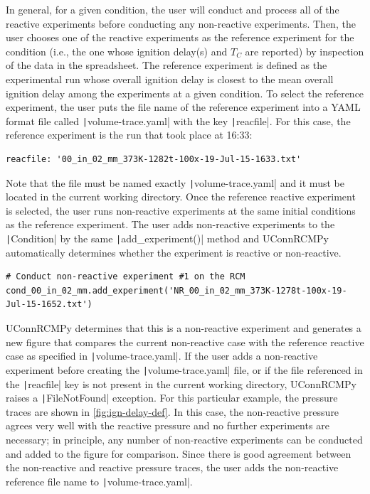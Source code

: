 \documentclass[12pt]{../ussci}
\begin{document}
In general, for a given condition, the user will conduct and process all
of the reactive experiments before conducting any non-reactive
experiments. Then, the user chooses one of the reactive experiments as
the reference experiment for the condition (i.e., the one whose ignition
delay(s) and \(T_C\) are reported) by inspection of the data in the
spreadsheet. The reference experiment is defined as the experimental run
whose overall ignition delay is closest to the mean overall ignition
delay among the experiments at a given condition. To select the
reference experiment, the user puts the file name of the reference
experiment into a YAML format file called \texttt|volume-trace.yaml|
with the key \texttt|reacfile|. For this case, the reference experiment
is the run that took place at 16:33:

\begin{verbatim}
reacfile: '00_in_02_mm_373K-1282t-100x-19-Jul-15-1633.txt'
\end{verbatim}

Note that the file must be named exactly \texttt|volume-trace.yaml| and
it must be located in the current working directory. Once the reference
reactive experiment is selected, the user runs non-reactive experiments
at the same initial conditions as the reference experiment. The user
adds non-reactive experiments to the \texttt|Condition| by the same
\texttt|add_experiment()| method and UConnRCMPy automatically
determines whether the experiment is reactive or non-reactive.

\begin{verbatim}
# Conduct non-reactive experiment #1 on the RCM
cond_00_in_02_mm.add_experiment('NR_00_in_02_mm_373K-1278t-100x-19-Jul-15-1652.txt')
\end{verbatim}

UConnRCMPy determines that this is a non-reactive experiment and
generates a new figure that compares the current non-reactive case with
the reference reactive case as specified in \texttt|volume-trace.yaml|.
If the user adds a non-reactive experiment before creating the
\texttt|volume-trace.yaml| file, or if the file referenced in the
\texttt|reacfile| key is not present in the current working directory,
UConnRCMPy raises a \texttt|FileNotFound| exception. For this particular
example, the pressure traces are shown in \cref{fig:ign-delay-def}. In this case, the non-reactive
pressure agrees very well with the reactive pressure and no further
experiments are necessary; in principle, any number of non-reactive
experiments can be conducted and added to the figure for comparison.
Since there is good agreement between the non-reactive and reactive
pressure traces, the user adds the non-reactive reference file name to
\texttt|volume-trace.yaml|.
\end{document}
